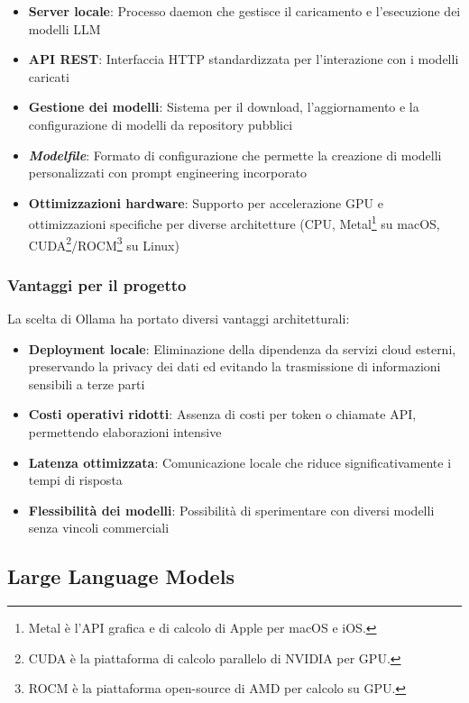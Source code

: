 \documentclass[12pt]{report}
\begin{document}
\begin{itemize}
    \item \textbf{Server locale}: Processo daemon che gestisce il caricamento e l'esecuzione dei modelli LLM
    \item \textbf{API REST}: Interfaccia HTTP standardizzata per l'interazione con i modelli caricati
    \item \textbf{Gestione dei modelli}: Sistema per il download, l'aggiornamento e la configurazione di modelli da repository pubblici
    \item \textit{\textbf{Modelfile}}: Formato di configurazione che permette la creazione di modelli personalizzati con prompt engineering incorporato
    \item \textbf{Ottimizzazioni hardware}: Supporto per accelerazione GPU e ottimizzazioni specifiche per diverse architetture (CPU, Metal\footnote{Metal è l'API grafica e di calcolo di Apple per macOS e iOS.} su macOS, CUDA\footnote{CUDA è la piattaforma di calcolo parallelo di NVIDIA per GPU.}/ROCM\footnote{ROCM è la piattaforma open-source di AMD per calcolo su GPU.} su Linux)
\end{itemize}

\subsubsection{Vantaggi per il progetto}
La scelta di Ollama ha portato diversi vantaggi architetturali:

\begin{itemize}
    \item \textbf{Deployment locale}: Eliminazione della dipendenza da servizi cloud esterni, preservando la privacy dei dati ed evitando la trasmissione di informazioni sensibili a terze parti
    \item \textbf{Costi operativi ridotti}: Assenza di costi per token o chiamate API, permettendo elaborazioni intensive
    \item \textbf{Latenza ottimizzata}: Comunicazione locale che riduce significativamente i tempi di risposta
    \item \textbf{Flessibilità dei modelli}: Possibilità di sperimentare con diversi modelli senza vincoli commerciali
\end{itemize}

\subsection{Large Language Models}
\label{subsec:llm}
\end{document}
